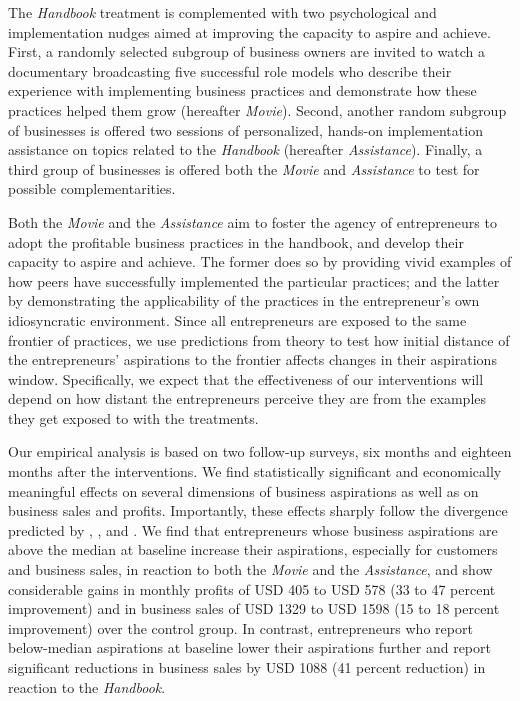 \documentclass[11.5pt]{article}
\begin{document}

The \emph{Handbook} treatment is complemented with two psychological and implementation nudges aimed at improving the capacity to aspire and achieve. First, a randomly selected subgroup of business owners are invited to watch a documentary broadcasting five successful role models who describe their experience with implementing business practices and demonstrate how these practices helped them grow (hereafter \emph{Movie}).
Second, another random subgroup of businesses is offered two sessions of personalized, hands-on implementation assistance on topics related to the \emph{Handbook} (hereafter \emph{Assistance}). Finally, a third group of businesses is offered both the \emph{Movie} and \emph{Assistance} to test for possible complementarities.

Both the \emph{Movie} and the \emph{Assistance} aim to foster the agency of entrepreneurs to adopt the profitable business practices in the handbook, and develop their capacity to aspire and achieve. The former does so by providing vivid examples of how peers have successfully implemented the particular practices; and the latter by demonstrating the applicability of the practices in the entrepreneur's own idiosyncratic environment. Since all entrepreneurs are exposed to the same frontier of practices, we use predictions from theory to test how initial distance of the entrepreneurs' aspirations to the frontier affects changes in their aspirations window. Specifically, we expect that the effectiveness of our interventions will depend on how distant the entrepreneurs perceive they are from the examples they get exposed to with the treatments.

Our empirical analysis is based on two follow-up surveys, six months and eighteen months after the interventions. We find statistically significant and economically meaningful effects on several dimensions of business aspirations as well as on business sales and profits. Importantly, these effects sharply follow the divergence predicted by \citet{Ray2006}, \citet{Genicot2017}, and \citet{Dalton2016}. We find that entrepreneurs whose business aspirations are above the median at baseline increase their aspirations, especially for customers and business sales, in reaction to both the \emph{Movie} and the \emph{Assistance}, and show considerable gains in monthly profits of USD 405 to USD 578 (33 to 47 percent improvement) and in business sales of USD 1329 to USD 1598 (15 to 18 percent improvement) over the control group. In contrast, entrepreneurs who report below-median aspirations at baseline lower their aspirations further and report significant reductions in business sales by USD 1088 (41 percent reduction) in reaction to the \emph{Handbook}.
\end{document}
